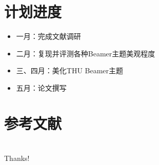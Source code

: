\documentclass[10pt,aspectratio=43,mathserif]{beamer}
\begin{document}
\section{计划进度}
\begin{frame}
  \begin{itemize}
    \item 一月：完成文献调研
    \item 二月：复现并评测各种Beamer主题美观程度
    \item 三、四月：美化THU Beamer主题
    \item 五月：论文撰写
  \end{itemize}
\end{frame}

\section*{参考文献}
\begin{frame}
\end{frame}

\section*{}
\begin{frame}
  \begin{center}
    {\Huge\calligra Thanks!}
  \end{center}
\end{frame}
\end{document}
